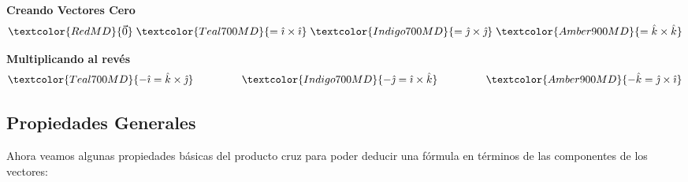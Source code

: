\documentclass[12pt, fleqn]{report}                             %
\DeclareMathOperator \MegaSpace {\quad \quad}                   %
\theoremstyle{break}                                            %
\newcommand{\hati} {\hat{\imath}}                               %
\newcommand{\hatj} {\hat{\jmath}}                               %
\newcommand{\hatk} {\hat{k}}                                    %
\begin{document}
                \textbf{Creando Vectores Cero}
                    \begin{align*}
                        \textcolor{RedMD}
                            {\vec{0}}
                            \;
                        \textcolor{Teal700MD}
                            { = \hati \times \hati}
                            \;
                        \textcolor{Indigo700MD}
                            { = \hatj \times \hatj}
                            \;
                        \textcolor{Amber900MD}
                            { = \hatk \times \hatk}
                    \end{align*}

                \textbf{Multiplicando al revés}
                    \begin{align*}
                        \textcolor{Teal700MD}
                        {-\hati = \hatk \times \hatj}
                            \MegaSpace \MegaSpace
                        \textcolor{Indigo700MD}
                        {-\hatj = \hati \times \hatk}
                            \MegaSpace \MegaSpace
                        \textcolor{Amber900MD}
                        {-\hatk = \hatj \times \hati}
                    \end{align*}
            
            \clearpage
            \subsection{Propiedades Generales}

                Ahora veamos algunas propiedades básicas del producto cruz para poder deducir una fórmula
                en términos de las componentes de los vectores:
                
\end{document}
